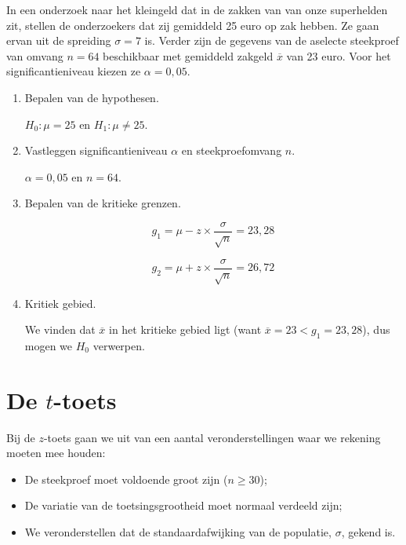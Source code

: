 \begin{example}
  In een onderzoek naar het kleingeld dat in de zakken van van onze superhelden zit, stellen de onderzoekers dat zij gemiddeld 25 euro op zak hebben. Ze gaan ervan uit de spreiding $\sigma = 7$ is. Verder zijn de gegevens van de aselecte steekproef van omvang $n=64$ beschikbaar met gemiddeld zakgeld $\overline{x}$ van 23 euro. Voor het significantieniveau kiezen ze $\alpha = 0,05$.
  
  \begin{enumerate}
    \item Bepalen van de hypothesen.
    
    $H_{0} : \mu = 25$ en $H_{1}: \mu \neq 25$.
    
    \item Vastleggen significantieniveau $\alpha$ en steekproefomvang $n$.
    
    $\alpha = 0,05$ en $n=64$.
    
    \item Bepalen van de kritieke grenzen.
    
    \[ g_{1} = \mu - z \times \frac{\sigma}{\sqrt{n}} = 23,28 \]
    
    \[ g_{2} = \mu + z \times \frac{\sigma}{\sqrt{n}} = 26,72 \]
    
    \item Kritiek gebied.
    
    We vinden dat $\overline{x}$ in het kritieke gebied ligt (want $\overline{x} = 23 < g_1 = 23,28$), dus mogen we $H_{0}$ verwerpen.
    
  \end{enumerate}
\end{example}

\section{De \texorpdfstring{$t$}{t}-toets}
\label{sec:t-toets}

Bij de $z$-toets gaan we uit van een aantal veronderstellingen waar we rekening moeten mee houden:

\begin{itemize}
  \item De steekproef moet voldoende groot zijn ($n \ge 30$);
  \item De variatie van de toetsingsgrootheid moet normaal verdeeld zijn;
  \item We veronderstellen dat de standaardafwijking van de populatie, $\sigma$, gekend is.
\end{itemize}

